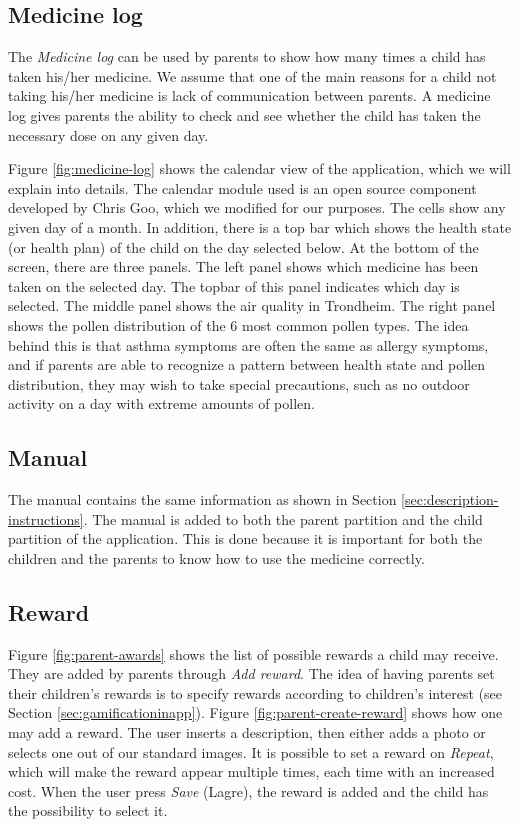 \subsection{Medicine log}
\label{sec:description-medicine-log}
The \emph{Medicine log} can be used by parents to show how many times a child has taken his/her medicine. We assume that one of the main reasons for a child not taking his/her medicine is lack of communication between parents. A medicine log gives parents the ability to check and see whether the child has taken the necessary dose on any given day.


Figure \ref{fig:medicine-log} shows the calendar view of the application, which we will explain into details. The calendar module used is an open source component developed by Chris Goo, which we modified for our purposes. The cells show any given day of a month. In addition, there is a top bar which shows the health state (or health plan) of the child on the day selected below. At the bottom of the screen, there are three panels. The left panel shows which medicine has been taken on the selected day. The topbar of this panel indicates which day is selected. The middle panel shows the air quality in Trondheim. The right panel shows the pollen distribution of the 6 most common pollen types. The idea behind this is that asthma symptoms are often the same as allergy symptoms, and if parents are able to recognize a pattern between health state and pollen distribution, they may wish to take special precautions, such as no outdoor activity on a day with extreme amounts of pollen.    


\subsection{Manual}
\label{sec:description-manual}
The manual contains the same information as shown in Section \ref{sec:description-instructions}. The manual is added to both the parent partition and the child partition of the application. This is done because it is important for both the children and the parents to know how to use the medicine correctly. 


\subsection{Reward}
\label{sec:description-manage-rewards}
Figure \ref{fig:parent-awards} shows the list of possible rewards a child may receive. They are added by parents through \emph{Add reward}. The idea of having parents set their children's rewards is to specify rewards according to children's interest (see Section \ref{sec:gamificationinapp}). Figure \ref{fig:parent-create-reward} shows how one may add a reward. The user inserts a description, then either adds a photo or selects one out of our standard images. It is possible to set a reward on \emph{Repeat}, which will make the reward appear multiple times, each time with an increased cost.        
When the user press \emph{Save} (Lagre), the reward is added and the child has the possibility to select it. 
 

